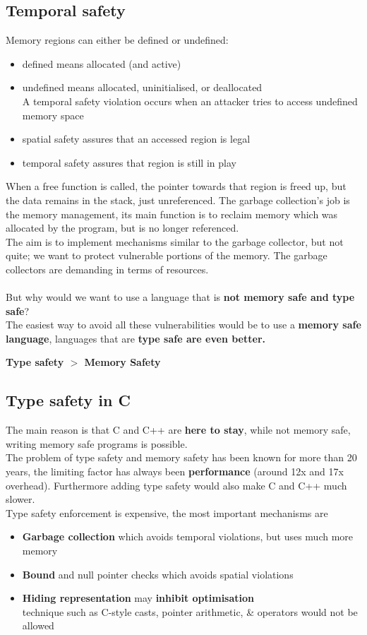 \documentclass[11pt, oneside]{article}   	%
\begin{document}
\subsection*{Temporal safety}
Memory regions can either be defined or undefined:\begin{itemize}
\item defined means allocated (and active)
\item undefined means allocated, uninitialised, or deallocated\\
A temporal safety violation occurs when an attacker tries to access undefined memory space
\item spatial safety assures that an accessed region is legal
\item temporal safety assures that region is still in play
\end{itemize}
When a free function is called, the pointer towards that region is freed up, but the data remains in the stack, just unreferenced. The garbage collection's job is the memory management, its main function is to reclaim memory which was allocated by the program, but is no longer referenced.\\
The aim is to implement mechanisms similar to the garbage collector, but not quite; we want to protect vulnerable portions of the memory. The garbage collectors are demanding in terms of resources.\\\\
But why would we want to use a language that is \textbf{not memory safe and type safe}?\\
The easiest way to avoid all these vulnerabilities would be to use a \textbf{memory safe language}, languages that are \textbf{type safe are even better.} 
\begin{center}
\textbf{Type safety  $>$ Memory Safety}
\end{center}
\subsection*{Type safety in C}
The main reason is that C and C++ are \textbf{here to stay}, while not memory safe, writing memory safe programs is possible.\\The problem of type safety and memory safety has been known for more than 20 years, the limiting factor has always been \textbf{performance}  (around 12x and 17x overhead). Furthermore adding type safety would also make C and C++ much slower. \\
Type safety enforcement is expensive, the most important mechanisms are 
\begin{itemize}
\item \textbf{Garbage collection} which avoids temporal violations, but uses much more memory
\item \textbf{Bound} and null pointer checks which avoids spatial violations
\item \textbf{Hiding representation} may \textbf{inhibit optimisation}\\
technique such as C-style casts, pointer arithmetic, \& operators would not be allowed
\end{itemize}
\end{document}
